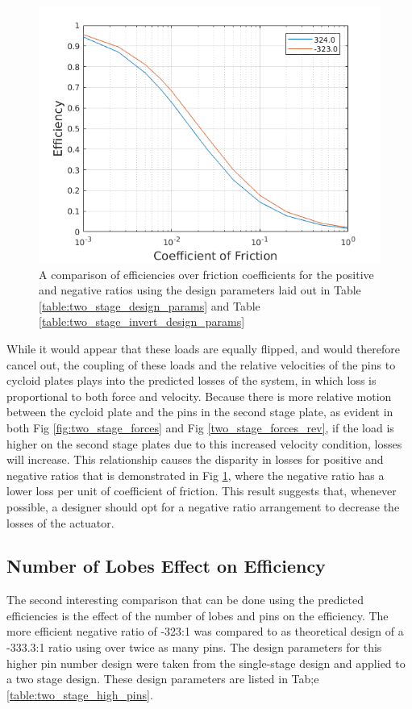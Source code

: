 \begin{figure}[h]
	\centering
	\includegraphics[width=0.75\linewidth]{fig/two_stage_pos_neg}
   \caption{A comparison of efficiencies over friction coefficients for the positive and negative ratios using the design parameters laid out in Table \ref{table:two_stage_design_params} and Table \ref{table:two_stage_invert_design_params}}
   \label{fig:two_stage_pos_neg}
\end{figure}

While it would appear that these loads are equally flipped, and would therefore cancel out, the coupling of these loads and the relative velocities of the pins to cycloid plates plays into the predicted losses of the system, in which loss is proportional to both force and velocity. Because there is more relative motion between the cycloid plate and the pins in the second stage plate, as evident in both Fig \ref{fig:two_stage_forces} and Fig \ref{two_stage_forces_rev}, if the load is higher on the second stage plates due to this increased velocity condition, losses will increase. This relationship causes the disparity in losses for positive and negative ratios that is demonstrated in Fig \ref{fig:two_stage_pos_neg}, where the negative ratio has a lower loss per  unit of coefficient of friction. This result suggests that, whenever possible, a designer should opt for a negative ratio arrangement to decrease the losses of the actuator. 



\subsection{Number of Lobes Effect on Efficiency}\label{ch:dual:discussion:num_lobes}

The second interesting comparison that can be done using the predicted efficiencies is the effect of the number of lobes and pins on the efficiency. The more efficient negative ratio of -323:1 was compared to as theoretical design of a -333.3:1 ratio using over twice as many pins. The design parameters for this higher pin number design were taken from the single-stage design and applied to a two stage design. These design parameters are listed in Tab;e \ref{table:two_stage_high_pins}. 

